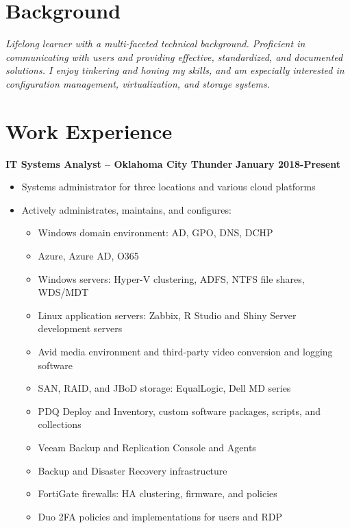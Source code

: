 \documentclass[line]{res}
\begin{document}

\address{Oklahoma City, OK $\parallel$ trjean.ou@gmail.com $\parallel$ (580) 304-6896}

\begin{resume}

\section{Background}
\emph{Lifelong learner with a multi-faceted technical background. Proficient in communicating with users and providing effective, standardized, and documented solutions. I enjoy tinkering and honing my skills, and am especially interested in configuration management, virtualization, and storage systems.}

\section{Work Experience}
\textbf{IT Systems Analyst -- Oklahoma City Thunder}
\newline
\textbf{January 2018-Present}
	\begin{itemize}
		\item Systems administrator for three locations and various cloud platforms
		\item Actively administrates, maintains, and configures:
			\begin{itemize}
				\item Windows domain environment: AD, GPO, DNS, DCHP
				\item Azure, Azure AD, O365 
				\item Windows servers: Hyper-V clustering, ADFS, NTFS file shares, WDS/MDT
				\item Linux application servers: Zabbix, R Studio and Shiny Server development servers
				\item Avid media environment and third-party video conversion and logging software
				\item SAN, RAID, and JBoD storage: EqualLogic, Dell MD series
				\item PDQ Deploy and Inventory, custom software packages, scripts, and collections
				\item Veeam Backup and Replication Console and Agents
				\item Backup and Disaster Recovery infrastructure
				\item FortiGate firewalls: HA clustering, firmware, and policies
				\item Duo 2FA policies and implementations for users and RDP

\end{itemize}
\end{itemize}
\end{resume}
\end{document}
